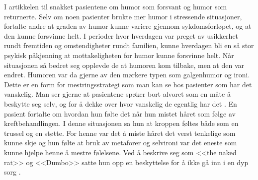 I artikkelen til  snakket pasientene om humor som forsvant
og humor som returnerte. Selv om noen pasienter brukte mer humor i stressende
situasjoner, fortalte andre at graden av humor kunne variere gjennom
sykdomsforløpet, og at den kunne forsvinne helt. I perioder hvor hverdagen var
preget av usikkerhet rundt fremtiden og omstendigheter rundt familien, kunne
hverdagen bli en så stor psykisk påkjenning at mottakeligheten for humor kunne
forsvinne helt. Når situasjonen så bedret seg opplevde de at humoren kom
tilbake, men at den var endret. Humoren var da gjerne av den mørkere typen som
galgenhumor og ironi. Dette er en form for mestringsstrategi som man kan se hos
pasienter som har det vanskelig. Man ser gjerne at pasientene spøker bort
alvoret som en måte å beskytte seg selv, og for å dekke over hvor vanskelig de
egentlig har det \cite{bohn2000}. En pasient fortalte om hvordan hun følte det
når hun mistet håret som følge av kreftbehandlingen. I denne situasjonen sa hun
at kroppen føltes både som en trussel og en støtte. For henne var det å miste
håret det verst tenkelige som kunne skje og hun følte at bruk av metaforer og
selvironi var det eneste som kunne hjelpe henne å mestre følelsene. Ved å
beskrive seg som <<the naked rat>> og <<Dumbo>> satte hun opp en beskyttelse
for å ikke gå inn i en dyp sorg \cite{roaldsen2015}.
